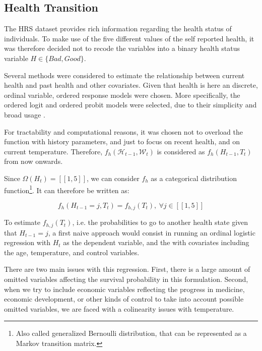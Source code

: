 \documentclass{article}
\begin{document}
\subsection{Health Transition}

The HRS dataset provides rich information regarding the health status of individuals. 
To make use of the five different values of the self reported health, it was therefore decided not to
recode the variables into a binary health status variable $H\in\{Bad, Good\}$. 

Several methods were considered to estimate the relationship between current health and past health and other covariates. 
Given that health is here an discrete, ordinal variable, ordered response models were chosen.
More specifically, the ordered logit and ordered probit models were selected, due to their simplicity and broad usage \parencite{Wooldridge_2010}.

For tractability and computational reasons, 
it was chosen not to overload the function with 
history parameters, and just to focus on recent health, 
and on current temperature.
Therefore, 
$f_{h}(\mathcal{H}_{t-1},\mathcal{W}_{t})$ 
is considered as $f_{h}(H_{t-1},{T}_{t})$ from now onwards.

Since $\Omega(H_{t}) = [\![1,5]\!]$, we can consider 
$f_{h}$ as a categorical distribution
function\footnote{Also called generalized Bernoulli distribution, that can be represented as a Markov transition matrix.}.
It can therefore be written as: 

\begin{equation}
    f_{h}(H_{t-1} = j,{T}_{t}) = 
    f_{h,j}(T_{t}), \ \forall j\in [\![1,5]\!]
\end{equation}

To estimate $f_{h,j}(T_{t})$,
i.e. the probabilities to go to another health state
given that $H_{t-1} = j$, 
a first naive approach would consist 
in running an ordinal logistic 
regression with $H_{t}$ as the dependent 
variable, and the with covariates including 
the age, temperature, and control variables.

There are two main issues with this regression. 
First, there is a large amount of omitted variables
affecting the survival probability in this formulation.
Second, when we try to include economic variables reflecting 
the progress in medicine, economic development, or 
other kinds of control to take into account possible
omitted variables, 
we are faced with a colinearity issues
with temperature. 
\end{document}
